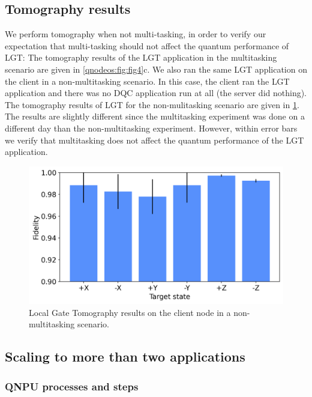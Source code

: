 \subsection{Tomography results}
\label{qnodeos:sec:multitasking-tomography}

We perform tomography when not multi-tasking, in order to verify our expectation that multi-tasking should not affect the quantum performance of \ac{LGT}: The tomography results of the \ac{LGT} application in the multitasking scenario are given in \cref{qnodeos:fig:fig4}c. We also ran the same \ac{LGT} application on the client in a non-multitasking scenario. In this case, the client ran the \ac{LGT} application and there was no \ac{DQC} application run at all (the server did nothing). The tomography results of \ac{LGT} for the non-mulitasking scenario are given in \cref{qnodeos:fig:tomography-no-multitasking}. The results are slightly different since the multitasking experiment was done on a different day than the non-multitasking experiment. However, within error bars we verify that multitasking does not affect the quantum performance of the \ac{LGT} application.

\begin{figure}
\centering
\includegraphics[width=\linewidth]{figures/qnodeos/supplementary/plots/noMT_gate_tomography.png}
\caption{Local Gate Tomography results on the client node in a non-multitasking scenario.}
\label{qnodeos:fig:tomography-no-multitasking}
\end{figure}

\subsection{Scaling to more than two applications}
\label{qnodeos:sec:multitasking-scaling}

\subsubsection{QNPU processes and steps}

